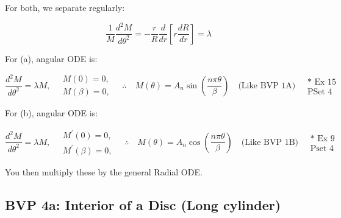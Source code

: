 \documentclass{report}
\begin{document}
\begin{center}
\begin{tikzpicture}[x=0.75pt,y=0.75pt,yscale=-1,xscale=1]
\end{tikzpicture}
\end{center}

For both, we separate regularly:

$$
\dfrac{1}{M} \dfrac{d^{2} M}{d \theta^{2}}=-\dfrac{r}{R} \dfrac{d}{d r}\left[r \dfrac{d R}{d r}\right]=\lambda
$$

For (a), angular ODE is:

$$
\dfrac{d^{2} M}{d \theta^{2}}=\lambda M,\quad 
\begin{aligned}
  M(0)=0,\\[1mm]
  M(\beta)=0,
\end{aligned}
\quad \therefore \quad 
M(\theta)=A_{n} \sin\left(\dfrac{n\pi\theta}{\beta}\right)
\quad \text{(Like BVP 1A)} \quad
\begin{array}{l}
  \text{* Ex 15}\\[2mm]
  \text{PSet 4}
\end{array}
$$

For (b), angular ODE is:

$$
\dfrac{d^{2} M}{d \theta^{2}}=\lambda M,\quad 
\begin{aligned}
  M^{\prime}(0)=0,\\[1mm]
  M^{\prime}(\beta)=0,
\end{aligned}
\quad \therefore \quad 
M(\theta)=A_{n} \cos\left(\dfrac{n\pi\theta}{\beta}\right)
\quad \text{(Like BVP 1B)} \quad
\begin{array}{l}
  \text{* Ex 9}\\[2mm]
  \text{Pset 4}
\end{array}
$$

You then multiply these by the general Radial ODE.

\subsection{BVP 4a: Interior of a Disc (Long cylinder)}
\end{document}
